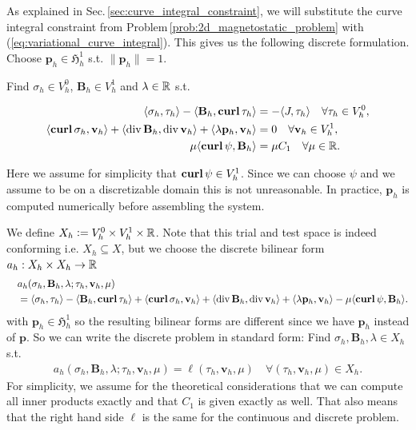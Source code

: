 \documentclass[../master_thesis.tex]{subfiles}
\begin{document}
As explained in Sec.\,\ref{sec:curve_integral_constraint}, 
we will substitute the curve integral constraint from Problem\,\ref{prob:2d_magnetostatic_problem} with 
(\ref{eq:variational_curve_integral}).
This gives us the following discrete formulation. Choose $\mathbf{p}_h \in \mathfrak{H}^1_h$ 
s.t. $\lVert \mathbf{p}_h \rVert = 1$. 

\begin{problem}\label{prob:magnetostatic_problem_discrete_variational}
    Find 
    $\sigma_h \in V_h^0$, $\mathbf{B}_h \in V_h^1$ and $\lambda \in \real$ s.t.

    \begin{align*}
        \langle \sigma_h, \tau_h \rangle - \langle \mathbf{B}_h, \veccurl\tau_h \rangle 
        &=  -\langle J, \tau_h \rangle \quad \forall \tau_h \in V_h^0, 
        \\ \langle \veccurl \sigma_h, \mathbf{v}_h \rangle + \langle \diver \mathbf{B}_h, \diver \mathbf{v}_h \rangle 
        + \langle \lambda \mathbf{p}_h, \mathbf{v}_h \rangle 
        &= 0 \quad \forall \mathbf{v}_h \in V^1_h, 
        \\ \mu \langle \bm{\curl} \psi, \mathbf{B}_h \rangle &= \mu C_1 \quad \forall \mu \in \real.
    \end{align*}
\end{problem}
Here we assume for simplicity that $\veccurl \psi \in V_h^1$. Since 
we can choose $\psi$ and we assume to be on a discretizable domain this is not unreasonable. In practice, $\mathbf{p}_h$ 
is computed numerically before assembling the system. 

We define $X_h \vcentcolon= V_h^0 \times V_h^1 \times \real$. 
Note that this trial and test space is indeed conforming i.e. $X_h \subseteq X$, 
but we choose the discrete bilinear form $a_h:X_h \times X_h \rightarrow \real$
\begin{align*}
    &a_h(\sigma_h,\mathbf{B}_h,\lambda;\tau_h,\mathbf{v}_h,\mu)
    \\ \quad&= \langle \sigma_h, \tau_h \rangle - \langle \mathbf{B}_h, \veccurl\tau_h \rangle
    + \langle \veccurl\sigma_h, \mathbf{v}_h \rangle + \langle \diver \mathbf{B}_h, \diver \mathbf{v}_h \rangle 
    + \langle \lambda \mathbf{p}_h, \mathbf{v}_h \rangle - \mu \langle \veccurl \psi, \mathbf{B}_h \rangle.
\end{align*} 
with $\mathbf{p}_h \in \mathfrak{H}^1_h$ 
so the resulting bilinear forms are different since we have $\mathbf{p}_h$ 
instead of $\mathbf{p}$. So we can write the discrete problem in 
standard form: Find $\sigma_h,\mathbf{B}_h,\lambda \in X_h$ s.t.
\begin{align*}
    a_h(\sigma_h,\mathbf{B}_h,\lambda;\tau_h,\mathbf{v}_h,\mu) = \ell(\tau_h,\mathbf{v}_h,\mu) 
    \quad \forall (\tau_h,\mathbf{v}_h,\mu) \in X_h.
\end{align*}
For simplicity, we assume for the theoretical considerations that we can 
compute all inner products exactly and that $C_1$ is 
given exactly as well. That also means that the right hand side $\ell$ is the 
same for the continuous and discrete problem.
\end{document}

